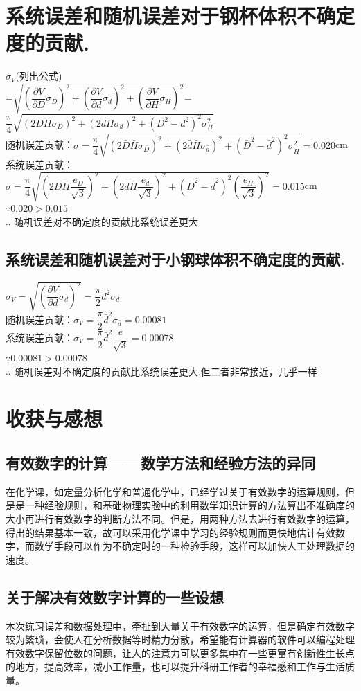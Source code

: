 \documentclass{article}
\begin{document}
\section{\small 系统误差和随机误差对于钢杯体积不确定度的贡献.}
$\sigma_{V}$(列出公式)\\={$ \sqrt{(\dfrac{\partial V}{\partial D}  \sigma_{D})^{2} + (\dfrac{\partial V}{\partial d} \sigma_{d})^{2} + (\dfrac{\partial V}{\partial H}  \sigma_{H})^{2}  } $}=$\dfrac{\pi}{4}\sqrt{(2DH  \sigma_D)^2+(2dH\sigma_d)^2+(D^2-d^2)^2\sigma_H^2}$\\
随机误差贡献：$\sigma=\dfrac{\pi}{4}\sqrt{(2\bar{D}\bar{H}  \sigma_{\bar{D}})^2+(2\bar{d}\bar{H}\sigma_{\bar{d}})^2+(\bar{D}^2-\bar{d}^2)^2\sigma_{\bar{H}}^2}=0.020$cm\\
系统误差贡献：$\sigma=\dfrac{\pi}{4}\sqrt{(2\bar{D}\bar{H} \dfrac{e_D}{\sqrt{3}})^2+(2\bar{d}\bar{H}\dfrac{e_d}{\sqrt{3}})^2+(\bar{D}^2-\bar{d}^2)^2(\dfrac{e_H}{\sqrt{3}})^2}=0.015$cm\\
$\because 0.020 > 0.015$\\
$\therefore$ 随机误差对不确定度的贡献比系统误差更大

\subsection{\small 系统误差和随机误差对于小钢球体积不确定度的贡献.}
$\sigma_V=\sqrt{(\dfrac{\partial V}{\partial d}\sigma_d)^2}=\dfrac{\pi}{2}d^2\sigma_d$\\
随机误差贡献：$\sigma_V=\dfrac{\pi}{2}\bar{d}^2\sigma_{\bar{d}}=0.00081$\\
系统误差贡献：$\sigma_V=\dfrac{\pi}{2}\bar{d}^2\dfrac{e}{\sqrt{3}}=0.00078$\\
$\because 0.00081 > 0.00078$\\
$\therefore$ 随机误差对不确定度的贡献比系统误差更大,但二者非常接近，几乎一样\\
\section{收获与感想}
\subsection{有效数字的计算——数学方法和经验方法的异同}
在化学课，如定量分析化学和普通化学中，已经学过关于有效数字的运算规则，但是是一种经验规则，和基础物理实验中的利用数学知识计算的方法算出不准确度的大小再进行有效数字的判断方法不同。但是，用两种方法去进行有效数字的运算，得出的结果基本一致，故可以采用化学课中学习的经验规则而更快地估计有效数字，而数学手段可以作为不确定时的一种检验手段，这样可以加快人工处理数据的速度。
\subsection{关于解决有效数字计算的一些设想}
本次练习误差和数据处理中，牵扯到大量关于有效数字的运算，但是确定有效数字较为繁琐，会使人在分析数据等时精力分散，希望能有计算器的软件可以编程处理有效数字保留位数的问题，让人的注意力可以更多集中在一些更富有创新性生长点的地方，提高效率，减小工作量，也可以提升科研工作者的幸福感和工作与生活质量。
\end{document}
